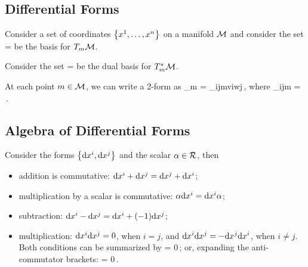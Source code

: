 \subsection{Differential Forms}
Consider a set of coordinates $\left\lbrace{{x}^{1},\dotsc,{x}^{n}}\right\rbrace$ on a manifold $\mathcal{M}$ and consider the set
\beq
{} = 
\eeq
be the basis for $T_m\mathcal{M}$.

Consider the set
\beq
{} = 
\eeq
be the dual basis for $T_m^*\mathcal{M}$.

At each point $m\in\mathcal{M}$, we can write a 2-form as
\beq
\Omega_m = \Omega_{ij}\vat m\cnvec vi\cnvec wj\,,
\eeq
where
\beq
\Omega_{ij}\vat m = \,.
\eeq


\subsection{Algebra of Differential Forms}
Consider the forms $\left\lbrace{\text{d}{x}^{i}, \text{d}{x}^{j}}\right\rbrace$ and the scalar $\alpha\in\mathcal{R}$, then
\begin{itemize}
\item addition is commutative: $\text{d}{x}^{i} + \text{d}{x}^{j} = \text{d}{x}^{j} + \text{d}{x}^{i}$;
\item multiplication by a scalar is commutative: $\alpha\text{d}{x}^{i} = \text{d}{x}^{i}\alpha$;
\item subtraction: $\text{d}{x}^{i} - \text{d}{x}^{j} = \text{d}{x}^{i} + (-1)\text{d}{x}^{j}$;
\item multiplication: $\text{d}{x}^{i}\text{d}{x}^{j} = 0$, when $i=j$, and $\text{d}{x}^{i}\text{d}{x}^{j} = -\text{d}{x}^{j}\text{d}{x}^{i}$, when $i\neq j$. Both conditions can be summarized by
\beq
{} = 0\,;
\eeq
or, expanding the anti-commutator brackets:
\beq
{} = 0\,.
\eeq
\end{itemize}

